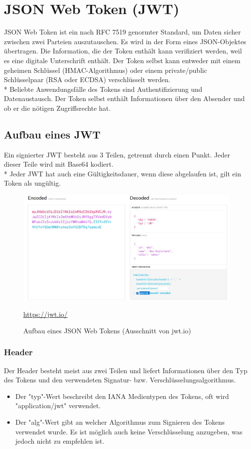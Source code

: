 \section{JSON Web Token (JWT)}
\author{Benjamin Besic}
JSON Web Token ist ein nach RFC 7519 genormter Standard, um Daten sicher zwischen zwei Parteien auszutauschen. Es wird in der Form eines JSON-Objektes übertragen.
Die Information, die der Token enthält kann verifiziert werden, weil es eine digitale Unterschrift enthält. Der Token selbst kann entweder mit einem geheimen Schlüssel (HMAC-Algorithmus) oder einem private/public Schlüsselpaar (RSA oder ECDSA) verschlüsselt werden.\\*
Beliebte Anwendungsfälle des Tokens sind Authentifizierung und Datenaustausch. Der Token selbst enthält Informationen über den Absender und ob er die nötigen Zugriffsrechte hat.
\cite{JWTIO} \cite{JWTIONOS}
\subsection{Aufbau eines JWT}
Ein signierter JWT besteht aus 3 Teilen, getrennt durch einen Punkt. Jeder dieser Teile wird mit Base64 kodiert. \\*
Jeder JWT hat auch eine Gültigkeitsdauer, wenn diese abgelaufen ist, gilt ein Token als ungültig.
\clearpage
\begin{figure}[htp]
    \centering
    \includegraphics[scale=0.4]{pics/JWT.JPG}
    \caption{Aufbau eines JSON Web Tokens (Ausschnitt von jwt.io)}
        \small \url{https://jwt.io/}
    \label{fig:impl:JWT}
\end{figure}

\subsubsection{Header}
Der Header besteht meist aus zwei Teilen und liefert Informationen über den Typ des Tokens und den verwendeten Signatur- bzw. Verschlüsselungsalgorithmus.
\begin{itemize}
    \item Der "typ"-Wert beschreibt den IANA Medientypen des Tokens, oft wird "application/jwt" verwendet.
    \item Der "alg"-Wert gibt an welcher Algorithmus zum Signieren des Tokens verwendet wurde. Es ist möglich auch keine Verschlüsselung anzugeben, was jedoch nicht zu empfehlen ist. \cite{JWTIONOS}     
\end{itemize}
